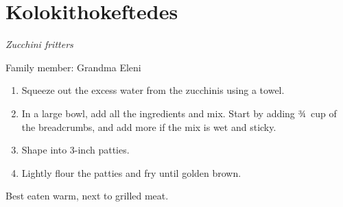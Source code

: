 \chapter{Kolokithokeftedes}
\label{ch:kolokithokeftedes}



\textit{Zucchini fritters}

Family member: Grandma Eleni

\begin{enumerate}
    \item Squeeze out the excess water from the zucchinis using a towel.
    \item In a large bowl, add all the ingredients and mix. Start by adding ¾~cup of the breadcrumbs, and add more if the mix is wet and sticky.
    \item Shape into 3-inch patties.
    \item Lightly flour the patties and fry until golden brown.
\end{enumerate}

Best eaten warm, next to grilled meat.
